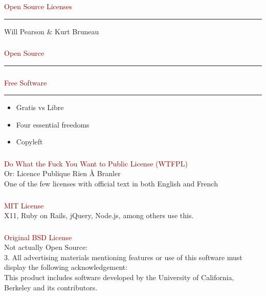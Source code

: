\documentclass[c]{beamer}
\newcommand{\TITLE}{\fontsize{50pt}{1em}\selectfont}
\begin{document}
  \begin{frame}
    \frametitle{}
    \centering
    \textcolor{darkred}{{\TITLE Open Source Licenses}} \\
    \vspace{1em} \hrule \vspace{1em}
    Will Pearson \& Kurt Bruneau
  \end{frame}
  \begin{frame}
    \frametitle{}
    \textcolor{darkred}{{\TITLE Open Source}}
    \vspace{1em} \hrule \vspace{1em}
  \end{frame}
  \begin{frame}
    \frametitle{}
    \textcolor{darkred}{{\TITLE Free Software}} \\
    \vspace{1em} \hrule \vspace{1em}
    \LARGE
    \begin{itemize}
    \item Gratis vs Libre
    \item Four essential freedoms
    \item Copyleft
    \end{itemize}
  \end{frame}
  \begin{frame}
    \frametitle{}
    \textcolor{darkred}{{\TITLE Do What the Fuck You Want to Public License (WTFPL) \\}}
    Or: Licence Publique Rien À Branler \\
    One of the few licenses with official text in both English and French  \\
  \end{frame}
  \begin{frame}
    \frametitle{}
    \textcolor{darkred}{{\TITLE MIT License \\}}
    X11, Ruby on Rails, jQuery, Node.js, among others use this. \\
  \end{frame}
  \begin{frame}
    \frametitle{}
    \textcolor{darkred}{{\TITLE Original BSD License \\}}
    Not actually Open Source: \\
    3. All advertising materials mentioning features or use of this software must display the following acknowledgement: \\
     This product includes software developed by the University of California, Berkeley and its contributors. \\
  \end{frame}
\end{document}

